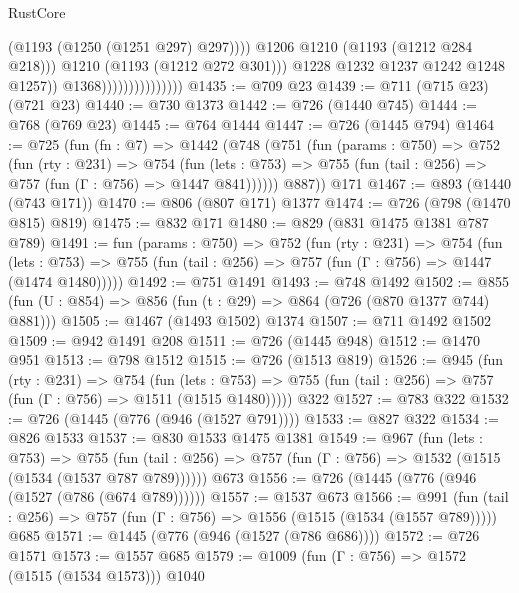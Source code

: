 \begin{lexlean}{RustCore}
\begin{coremodule}
                                              (@1193 (@1250 (@1251 @297) @297))))
                                          @1206
                                          @1210
                                          (@1193 (@1212 @284 @218)))
                                        @1210
                                        (@1193 (@1212 @272 @301)))
                                      @1228
                                      @1232
                                      @1237
                                      @1242
                                      @1248
                                      @1257))
                                  @1368)))))))))))))))
@1435 := @709 @23
@1439 := @711 (@715 @23) (@721 @23)
@1440 := @730 @1373
@1442 := @726 (@1440 @745)
@1444 := @768 (@769 @23)
@1445 := @764 @1444
@1447 := @726 (@1445 @794)
@1464 := @725
    (fun (fn : @7) =>
    @1442
      (@748
        (@751
          (fun (params : @750) =>
          @752
            (fun (rty : @231) =>
            @754
              (fun (lets : @753) =>
              @755 (fun (tail : @256) => @757 (fun (Γ : @756) => @1447 @841))))))
        @887))
    @171
@1467 := @893 (@1440 (@743 @171))
@1470 := @806 (@807 @171) @1377
@1474 := @726 (@798 (@1470 @815) @819)
@1475 := @832 @171
@1480 := @829 (@831 @1475 @1381 @787 @789)
@1491 := fun (params : @750) =>
  @752
    (fun (rty : @231) =>
    @754
      (fun (lets : @753) =>
      @755 (fun (tail : @256) => @757 (fun (Γ : @756) => @1447 (@1474 @1480)))))
@1492 := @751 @1491
@1493 := @748 @1492
@1502 := @855 (fun (U : @854) => @856 (fun (t : @29) => @864 (@726 (@870 @1377 @744) @881)))
@1505 := @1467 (@1493 @1502) @1374
@1507 := @711 @1492 @1502
@1509 := @942 @1491 @208
@1511 := @726 (@1445 @948)
@1512 := @1470 @951
@1513 := @798 @1512
@1515 := @726 (@1513 @819)
@1526 := @945
    (fun (rty : @231) =>
    @754
      (fun (lets : @753) =>
      @755 (fun (tail : @256) => @757 (fun (Γ : @756) => @1511 (@1515 @1480)))))
    @322
@1527 := @783 @322
@1532 := @726 (@1445 (@776 (@946 (@1527 @791))))
@1533 := @827 @322
@1534 := @826 @1533
@1537 := @830 @1533 @1475 @1381
@1549 := @967
    (fun (lets : @753) =>
    @755 (fun (tail : @256) => @757 (fun (Γ : @756) => @1532 (@1515 (@1534 (@1537 @787 @789))))))
    @673
@1556 := @726 (@1445 (@776 (@946 (@1527 (@786 (@674 @789))))))
@1557 := @1537 @673
@1566 := @991
    (fun (tail : @256) => @757 (fun (Γ : @756) => @1556 (@1515 (@1534 (@1557 @789)))))
    @685
@1571 := @1445 (@776 (@946 (@1527 (@786 @686))))
@1572 := @726 @1571
@1573 := @1557 @685
@1579 := @1009 (fun (Γ : @756) => @1572 (@1515 (@1534 @1573))) @1040

\end{coremodule}
\end{lexlean}
